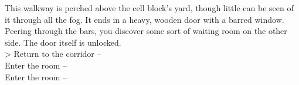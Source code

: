 This walkway is perched above the cell block’s yard, though little can be seen of it through all the fog. It ends in a heavy, wooden door with a barred window. Peering through the bars, you discover some sort of waiting room on the other side. The door itself is unlocked.\\

> Return to the corridor -- \\
 Enter the room -- \\
 Enter the room -- \\
